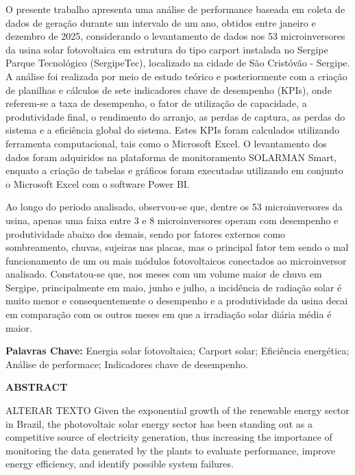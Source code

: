 O presente trabalho apresenta uma análise de performance baseada em coleta de dados de geração durante um intervalo de um ano, obtidos entre janeiro e dezembro de 2025, considerando o levantamento de dados nos 53 microinversores da usina solar fotovoltaica em estrutura do tipo carport instalada no Sergipe Parque Tecnológico (SergipeTec), localizado na cidade de São Cristóvão - Sergipe. A análise foi realizada por meio de estudo teórico e posteriormente com a criação de planilhas e cálculos de sete indicadores chave de desempenho (KPIs), onde referem-se a taxa de desempenho, o fator de utilização de capacidade, a produtividade final, o rendimento do arranjo, as perdas de captura, as perdas do sistema e a eficiência global do sistema. Estes KPIs foram calculados utilizando ferramenta computacional, tais como o Microsoft Excel.  O levantamento dos dados foram adquiridos na plataforma de monitoramento SOLARMAN Smart, enquato a criação de tabelas e gráficos foram executadas utilizando em conjunto o Microsoft Excel com o software Power BI. 

Ao longo do periodo analisado, observou-se que, dentre os 53 microinversores da usina, apenas uma faixa entre 3 e 8 microinversores operam com desempenho e produtividade abaixo dos demais, sendo por fatores externos como sombreamento, chuvas, sujeiras nas placas, mas o principal fator tem sendo o mal funcionamento de um ou mais módulos fotovoltaicos conectados ao microinversor analisado. Constatou-se que, nos meses com um volume maior de chuva em Sergipe, principalmente em maio, junho e julho, a incidência de radiação solar é muito menor e consequentemente o desempenho e a produtividade da usina decai em comparação com os outros meses em que a irradiação solar diária média é maior.

\noindent\textbf{Palavras Chave:} Energia solar fotovoltaica; Carport solar; Eficiência energética; Análise de performace; Indicadores chave de desempenho.



\cleardoublepage
\thispagestyle{empty}

\begin{center}
\textbf{ABSTRACT}
\end{center}

ALTERAR TEXTO
Given the exponential growth of the renewable energy sector in Brazil, the photovoltaic solar energy sector has been standing out as a competitive source of electricity generation, thus increasing the importance of monitoring the data generated by the plants to evaluate performance, improve energy efficiency, and identify possible system failures.

